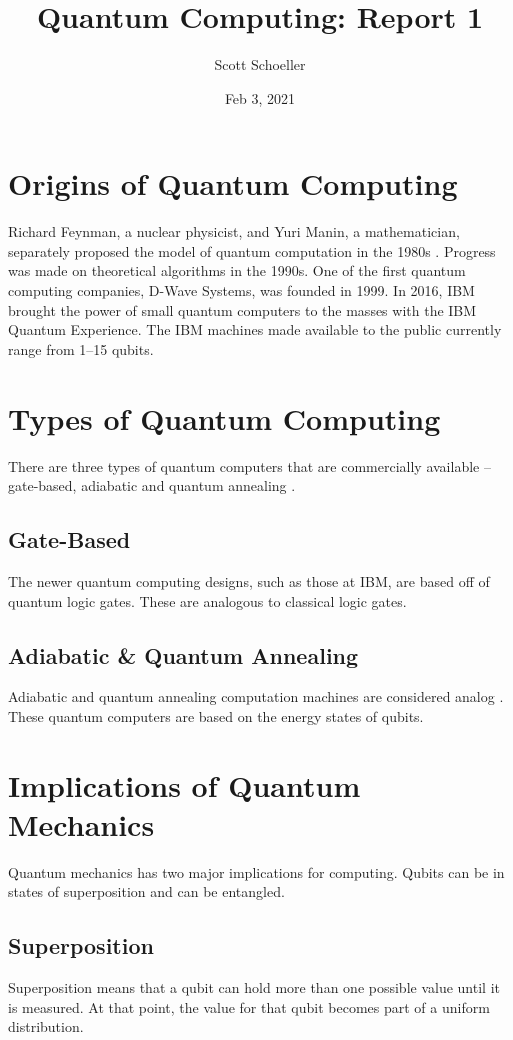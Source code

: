 \documentclass[12pt]{article}
\title{Quantum Computing: Report 1}
\author{Scott Schoeller}
\date{Feb 3, 2021}
\begin{document}
\maketitle

\begin{flushleft}
\newpage
{}

\section{Origins of Quantum Computing}
Richard Feynman, a nuclear physicist, and Yuri Manin, a mathematician, separately proposed the model of quantum computation in the 1980s \cite{cao_quantum_2019}. Progress was made on theoretical algorithms in the 1990s. One of the first quantum computing companies, D-Wave Systems, was founded in 1999. In 2016, IBM brought the power of small quantum computers to the masses with the IBM Quantum Experience. The IBM machines made available to the public currently range  from 1--15 qubits.
\section{Types of Quantum Computing}
There are three types of quantum computers that are commercially available -- gate-based, adiabatic and quantum annealing \cite{grumbling_quantum_2019}.
\subsection{Gate-Based}
The newer quantum computing designs, such as those at IBM, are based off of quantum logic gates. These are analogous to classical logic gates.
\subsection{Adiabatic \& Quantum Annealing}
Adiabatic and quantum annealing computation machines are considered analog \cite{grumbling_quantum_2019}. These quantum computers are based on the energy states of qubits.
\section{Implications of Quantum Mechanics}
Quantum mechanics has two major implications for computing. Qubits can be in states of superposition and can be entangled.
\subsection{Superposition}
Superposition means that a qubit can hold more than one possible value until it is measured. At that point, the value for that qubit becomes part of a uniform distribution.

\end{flushleft}
\end{document}
